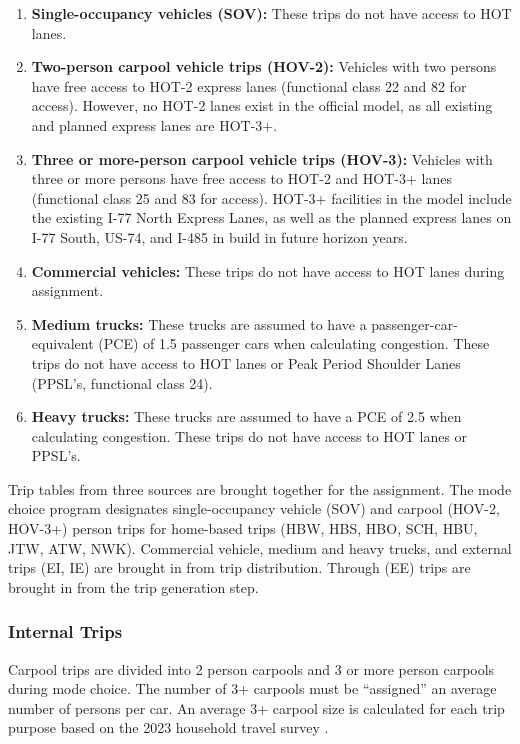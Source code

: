 \documentclass[
]{article}
\begin{document}
\begin{enumerate}
\def\labelenumi{\arabic{enumi}.}
\item
  \textbf{Single-occupancy vehicles (SOV):} These trips do not have
  access to HOT lanes.
\item
  \textbf{Two-person carpool vehicle trips (HOV-2):} Vehicles with two
  persons have free access to HOT-2 express lanes (functional class 22
  and 82 for access). However, no HOT-2 lanes exist in the official
  model, as all existing and planned express lanes are HOT-3+.
\item
  \textbf{Three or more-person carpool vehicle trips (HOV-3):} Vehicles
  with three or more persons have free access to HOT-2 and HOT-3+ lanes
  (functional class 25 and 83 for access). HOT-3+ facilities in the
  model include the existing I-77 North Express Lanes, as well as the
  planned express lanes on I-77 South, US-74, and I-485 in build in
  future horizon years.
\item
  \textbf{Commercial vehicles:} These trips do not have access to HOT
  lanes during assignment.
\item
  \textbf{Medium trucks:} These trucks are assumed to have a
  passenger-car-equivalent (PCE) of 1.5 passenger cars when calculating
  congestion. These trips do not have access to HOT lanes or Peak Period
  Shoulder Lanes (PPSL's, functional class 24).
\item
  \textbf{Heavy trucks:} These trucks are assumed to have a PCE of 2.5
  when calculating congestion. These trips do not have access to HOT
  lanes or PPSL's.
\end{enumerate}

Trip tables from three sources are brought together for the assignment.
The mode choice program designates single-occupancy vehicle (SOV) and
carpool (HOV-2, HOV-3+) person trips for home-based trips (HBW, HBS,
HBO, SCH, HBU, JTW, ATW, NWK). Commercial vehicle, medium and heavy
trucks, and external trips (EI, IE) are brought in from trip
distribution. Through (EE) trips are brought in from the trip generation
step.

\subsubsection{Internal Trips}\label{internal-trips}

Carpool trips are divided into 2 person carpools and 3 or more person
carpools during mode choice. The number of 3+ carpools must be
``assigned'' an average number of persons per car. An average 3+ carpool
size is calculated for each trip purpose based on the 2023 household
travel survey .
\end{document}
